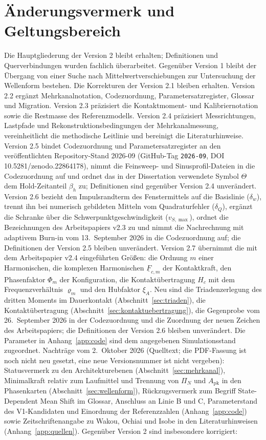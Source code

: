 \documentclass[11pt,a4paper]{article}
\begin{document}
\section*{Änderungsvermerk und Geltungsbereich}
Die Hauptgliederung der Version 2 bleibt erhalten; Definitionen und Querverbindungen wurden fachlich überarbeitet. Gegenüber Version 1 bleibt der Übergang von einer Suche nach Mittelwertverschiebungen zur Untersuchung der Wellenform bestehen. Die Korrekturen der Version 2.1 bleiben erhalten. Version 2.2 ergänzt Mehrkanalnotation, Codezuordnung, Parametersatzregister, Glossar und Migration. Version 2.3 präzisiert die Kontaktmoment- und Kalibriernotation sowie die Restmasse des Referenzmodells. Version 2.4 präzisiert Messrichtungen, Lastpfade und Rekonstruktionsbedingungen der Mehrkanalmessung, vereinheitlicht die methodische Leitlinie und bereinigt die Literaturhinweise. Version 2.5 bindet Codezuordnung und Parametersatzregister an den veröffentlichten Repository-Stand 2026-09 (GitHub-Tag \texttt{2026-09}, DOI 10.5281/zenodo.22864178), nimmt die Feinsweep- und Sinusprofil-Dateien in die Codezuordnung auf und ordnet das in der Dissertation verwendete Symbol $\Theta$ dem Hold-Zeitanteil $\beta_h$ zu; Definitionen sind gegenüber Version 2.4 unverändert. Version 2.6 bezieht den Impulsrandterm des Fenstermittels auf die Basislinie ($\delta_w$), trennt ihn bei numerisch gebildeten Mitteln vom Quadraturfehler ($\delta_Q$), ergänzt die Schranke über die Schwerpunktgeschwindigkeit ($v_{S,\max}$), ordnet die Bezeichnungen des Arbeitspapiers v2.3 zu und nimmt die Nachrechnung mit adaptivem Burn-in vom 13.~September 2026 in die Codezuordnung auf; die Definitionen der Version 2.5 bleiben unverändert. Version 2.7 übernimmt die mit dem Arbeitspapier v2.4 eingeführten Größen: die Ordnung $m$ einer Harmonischen, die komplexen Harmonischen $\underline{F}_{c,m}$ der Kontaktkraft, den Phasenfaktor $\Phi_m$ der Konfiguration, die Kontaktübertragung $H_c$ mit dem Frequenzverhältnis $\varrho_m$ und den Hubfaktor $\xi_A$. Neu sind die Triadenzerlegung des dritten Moments im Dauerkontakt (Abschnitt~\ref{sec:triaden}), die Kontaktübertragung (Abschnitt~\ref{sec:kontaktuebertragung}), die Gegenprobe vom 26.~September 2026 in der Codezuordnung und die Zuordnung der neuen Zeichen des Arbeitspapiers; die Definitionen der Version 2.6 bleiben unverändert. Die Parameter in Anhang~\ref{app:code} sind dem angegebenen Simulationsstand zugeordnet. Nachträge vom 2.~Oktober 2026 (Quelltext; die PDF-Fassung ist noch nicht neu gesetzt, eine neue Versionsnummer ist nicht vergeben): Statusvermerk zu den Architekturebenen (Abschnitt~\ref{sec:mehrkanal}), Minimalkraft relativ zum Laufmittel und Trennung von $\Pi_N$ und $A_{\mathrm{pk}}$ in den Phasenkarten (Abschnitt~\ref{sec:wellenform}), Rückzugsvermerk zum Begriff State-Dependent Mean Shift im Glossar, Anschluss an Linie B und C, Parameterstand des V1-Kandidaten und Einordnung der Referenzzahlen (Anhang~\ref{app:code}) sowie Zeitschriftenangabe zu Wakou, Ochiai und Isobe in den Literaturhinweisen (Anhang~\ref{app:quellen}). Gegenüber Version 2 sind insbesondere korrigiert:
\end{document}
